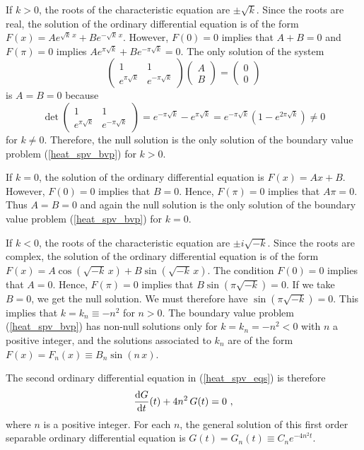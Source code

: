 \begin{egg}
If $k>0$, the roots of the characteristic equation are $\pm \sqrt{k}$.
Since the roots are real, the solution of the ordinary differential
equation is of the form $\displaystyle
F(x) = A e^{\sqrt{k}\,x} + B e^{-\sqrt{k}\, x}$.
However, $F(0)=0$ implies that $A+B=0$ and $F(\pi)=0$ implies
$\displaystyle A e^{\pi\sqrt{k}} + B e^{-\pi\sqrt{k}} = 0$.  The only
solution of the system
\[
\begin{pmatrix}
1 & 1 \\ e^{\pi\sqrt{k}} & e^{-\pi\sqrt{k}}
\end{pmatrix}
\begin{pmatrix}
A \\ B
\end{pmatrix}
=
\begin{pmatrix}
0 \\ 0 
\end{pmatrix}
\]
is $A=B=0$ because
\[
\det
\begin{pmatrix}
1 & 1 \\ e^{\pi\sqrt{k}} & e^{-\pi\sqrt{k}}
\end{pmatrix}
= e^{-\pi\sqrt{k}} - e^{\pi\sqrt{k}} 
= e^{-\pi\sqrt{k}}\left(1 - e^{2\pi\sqrt{k}}\right) \neq 0
\]
for $k\neq 0$.  Therefore, the null solution is the only solution
of the boundary value problem (\ref{heat_spv_bvp}) for $k>0$.

If $k=0$, the solution of the ordinary differential equation is $F(x)=Ax+B$.
However, $F(0)=0$ implies that $B=0$.  Hence, $F(\pi)=0$ implies
that $A\pi = 0$.  Thus $A=B=0$ and again the null solution is the
only solution of the boundary value problem (\ref{heat_spv_bvp}) for $k=0$.

If $k<0$, the roots of the characteristic equation are $\pm i \sqrt{-k}$.
Since the roots are complex, the solution of the ordinary differential
equation is of the form $\displaystyle
F(x) = A \cos\left(\sqrt{-k}\,x\right) + B \sin\left(\sqrt{-k}\,x\right)$.
The condition $F(0)=0$ implies that $A=0$.  Hence, $F(\pi)=0$ implies that
$B \sin\left(\pi\sqrt{-k}\right) = 0$.  If we take
$B=0$, we get the null solution.  We must therefore have
$\sin\left(\pi\sqrt{-k}\right) = 0$.  This implies that
$k = k_n \equiv -n^2$ for $n>0$.  The boundary value problem
(\ref{heat_spv_bvp}) has non-null solutions only for $k=k_n=-n^2<0$
with $n$ a positive integer, and the solutions associated to $k_n$ are of
the form $F(x)=F_n(x) \equiv B_n \sin(n\,x)$.

The second ordinary differential equation in (\ref{heat_spv_eqs}) is
therefore
\[
\frac{\mathrm{d}G}{\mathrm{d}{t}}(t) + 4n^2\,G(t) = 0 \  ,
\]
where $n$ is a positive integer.  For each $n$, the general solution
of this first order separable ordinary differential equation is
$\displaystyle G(t) = G_n(t) \equiv C_n e^{-4n^2t}$.


\end{egg}
